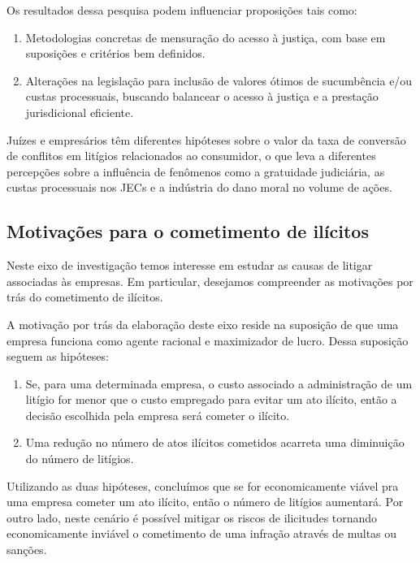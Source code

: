 \documentclass[]{report}
\providecommand{\tightlist}{%
  \setlength{\itemsep}{0pt}\setlength{\parskip}{0pt}}
\begin{document}
Os resultados dessa pesquisa podem influenciar proposições tais como:

\begin{enumerate}
\def\labelenumi{\arabic{enumi}.}
\tightlist
\item
  Metodologias concretas de mensuração do acesso à justiça, com base em
  suposições e critérios bem definidos.
\item
  Alterações na legislação para inclusão de valores ótimos de
  sucumbência e/ou custas processuais, buscando balancear o acesso à
  justiça e a prestação jurisdicional eficiente.
\end{enumerate}

Juízes e empresários têm diferentes hipóteses sobre o valor da taxa de
conversão de conflitos em litígios relacionados ao consumidor, o que
leva a diferentes percepções sobre a influência de fenômenos como a
gratuidade judiciária, as custas processuais nos JECs e a indústria do
dano moral no volume de ações.

\subsection{Motivações para o cometimento de
ilícitos}\label{motivacoes-para-o-cometimento-de-ilicitos}

Neste eixo de investigação temos interesse em estudar as causas de
litigar associadas às empresas. Em particular, desejamos compreender as
motivações por trás do cometimento de ilícitos.

A motivação por trás da elaboração deste eixo reside na suposição de que
uma empresa funciona como agente racional e maximizador de lucro. Dessa
suposição seguem as hipóteses:

\begin{enumerate}
\def\labelenumi{\arabic{enumi}.}
\tightlist
\item
  Se, para uma determinada empresa, o custo associado a administração de
  um litígio for menor que o custo empregado para evitar um ato ilícito,
  então a decisão escolhida pela empresa será cometer o ilícito.
\item
  Uma redução no número de atos ilícitos cometidos acarreta uma
  diminuição do número de litígios.
\end{enumerate}

Utilizando as duas hipóteses, concluímos que se for economicamente
viável pra uma empresa cometer um ato ilícito, então o número de
litígios aumentará. Por outro lado, neste cenário é possível mitigar os
riscos de ilicitudes tornando economicamente inviável o cometimento de
uma infração através de multas ou sanções.
\end{document}

